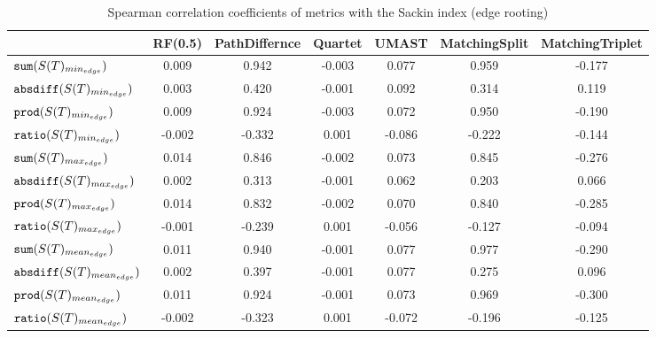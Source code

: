 \begin{table}[h]
\centering
\caption{Spearman correlation coefficients of metrics with the Sackin index (edge rooting)}
\begin{tabular}{lcccccc}
 & RF(0.5) & PathDiffernce & Quartet & UMAST & MatchingSplit & MatchingTriplet \\
\hline
${\verb+sum+}(S(T)_{min_{edge}})$ & 0.009 & 0.942 & -0.003 & 0.077 & 0.959 & -0.177 \\
${\verb+absdiff+}(S(T)_{min_{edge}})$ & 0.003 & 0.420 & -0.001 & 0.092 & 0.314 & 0.119 \\
${\verb+prod+}(S(T)_{min_{edge}})$ & 0.009 & 0.924 & -0.003 & 0.072 & 0.950 & -0.190 \\
${\verb+ratio+}(S(T)_{min_{edge}})$ & -0.002 & -0.332 & 0.001 & -0.086 & -0.222 & -0.144 \\
${\verb+sum+}(S(T)_{max_{edge}})$ & 0.014 & 0.846 & -0.002 & 0.073 & 0.845 & -0.276 \\
${\verb+absdiff+}(S(T)_{max_{edge}})$ & 0.002 & 0.313 & -0.001 & 0.062 & 0.203 & 0.066 \\
${\verb+prod+}(S(T)_{max_{edge}})$ & 0.014 & 0.832 & -0.002 & 0.070 & 0.840 & -0.285 \\
${\verb+ratio+}(S(T)_{max_{edge}})$ & -0.001 & -0.239 & 0.001 & -0.056 & -0.127 & -0.094 \\
${\verb+sum+}(S(T)_{mean_{edge}})$ & 0.011 & 0.940 & -0.001 & 0.077 & 0.977 & -0.290 \\
${\verb+absdiff+}(S(T)_{mean_{edge}})$ & 0.002 & 0.397 & -0.001 & 0.077 & 0.275 & 0.096 \\
${\verb+prod+}(S(T)_{mean_{edge}})$ & 0.011 & 0.924 & -0.001 & 0.073 & 0.969 & -0.300 \\
${\verb+ratio+}(S(T)_{mean_{edge}})$ & -0.002 & -0.323 & 0.001 & -0.072 & -0.196 & -0.125 \\
\end{tabular}
\end{table}

